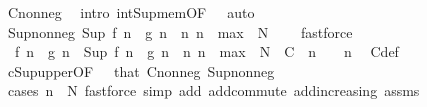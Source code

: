 \begin{isabellebody}
\ C{\isacharunderscore}{\kern0pt}nonneg\ \isamarkupfalse%
\ {\isacharparenleft}{\kern0pt}intro\ int{\isacharunderscore}{\kern0pt}Sup{\isacharunderscore}{\kern0pt}mem{\isacharbrackleft}{\kern0pt}OF\ {\isacharunderscore}{\kern0pt}\ {\isacharasterisk}{\kern0pt}{\isacharbrackright}{\kern0pt}{\isacharparenright}{\kern0pt}\ auto\isanewline
\ \ \isamarkupfalse%
\ Sup{\isacharunderscore}{\kern0pt}nonneg{\isacharcolon}{\kern0pt}\ {\isachardoublequoteopen}Sup\ {\isacharbraceleft}{\kern0pt}{\isasymbar}f\ n\ {\isacharminus}{\kern0pt}\ g\ n{\isasymbar}\ {\isacharbar}{\kern0pt}\ n{\isachardot}{\kern0pt}\ n\ {\isasymin}\ {\isacharbraceleft}{\kern0pt}{}{\isachardot}{\kern0pt}{\isachardot}{\kern0pt}max\ {}\ N{\isacharbraceright}{\kern0pt}{\isacharbraceright}{\kern0pt}\ {\isasymge}\ {}{\isachardoublequoteclose}\ \isamarkupfalse%
\ fastforce\isanewline
\isanewline
\ \ \isamarkupfalse%
\ {\isacharasterisk}{\kern0pt}{\isacharcolon}{\kern0pt}\ {\isachardoublequoteopen}{\isasymbar}f\ n\ {\isacharminus}{\kern0pt}\ g\ n{\isasymbar}\ {\isasymle}\ Sup\ {\isacharbraceleft}{\kern0pt}{\isasymbar}f\ n\ {\isacharminus}{\kern0pt}\ g\ n{\isasymbar}\ {\isacharbar}{\kern0pt}\ n{\isachardot}{\kern0pt}\ n\ {\isasymin}\ {\isacharbraceleft}{\kern0pt}{}{\isachardot}{\kern0pt}{\isachardot}{\kern0pt}max\ {}\ N{\isacharbraceright}{\kern0pt}{\isacharbraceright}{\kern0pt}\ {\isacharplus}{\kern0pt}\ C{\isachardoublequoteclose}\ \ {\isachardoublequoteopen}n\ {\isasymge}\ {}{\isachardoublequoteclose}\ \ n\ \isamarkupfalse%
\ C{\isacharprime}{\kern0pt}{\isacharunderscore}{\kern0pt}def\ \isamarkupfalse%
\ cSup{\isacharunderscore}{\kern0pt}upper{\isacharbrackleft}{\kern0pt}OF\ {\isacharunderscore}{\kern0pt}\ {\isacharasterisk}{\kern0pt}{\isacharbrackright}{\kern0pt}\ that\ C{\isacharunderscore}{\kern0pt}nonneg\ Sup{\isacharunderscore}{\kern0pt}nonneg\ \isamarkupfalse%
\ {\isacharparenleft}{\kern0pt}cases\ {\isachardoublequoteopen}n\ {\isasymle}\ N{\isachardoublequoteclose}{\isacharparenright}{\kern0pt}\ {\isacharparenleft}{\kern0pt}fastforce\ simp\ add{\isacharcolon}{\kern0pt}\ add{\isachardot}{\kern0pt}commute\ add{\isacharunderscore}{\kern0pt}increasing{}\ assms{\isacharparenleft}{\kern0pt}{}{\isacharparenright}{\kern0pt}{\isacharparenright}{\kern0pt}{\isacharplus}{\kern0pt}\isanewline
\ \ \isacommand{{\isacharbraceleft}{\kern0pt}}\isamarkupfalse%
\isanewline
\ \ \ \ \isamarkupfalse%

\end{isabellebody}
